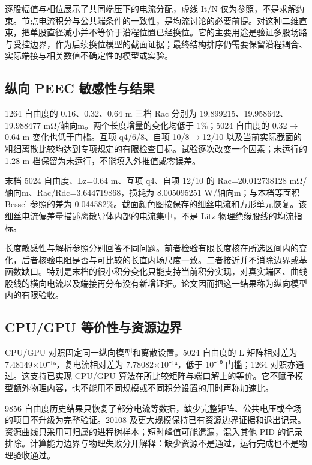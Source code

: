 \documentclass[11pt]{article}
\begin{document}
逐股幅值与相位展示了共同端压下的电流分配，虚线 It/N 仅为参照，不是求解约束。节点电流积分与公共端条件的一致性，是均流讨论的必要前提。对这种二维直束，把单股直径减小并不等价于沿程位置已经换位。它的主要用途是验证多股场路与受控边界，作为后续换位模型的截面证据；最终结构排序仍需要保留沿程耦合、实际端接与相关数值不确定性的模型或实验。


\subsection*{纵向 PEEC 敏感性与结果}
\hypertarget{03.peec_results.heading}{}
1264 自由度的 0.16、0.32、0.64 m 三档 Rac 分别为 19.899215、19.958642、19.988477 mΩ/轴向m。两个长度增量的变化均低于 1\%；5024 自由度的 0.32\(\to\)0.64 m 变化也低于门槛。互项 q4/6/8、自项 10/8\(\to\)12/10 以及当前实际截面的粗细离散比较均达到专项规定的有限检查目标。试验逐次改变一个因素；未运行的 1.28 m 档保留为未运行，不能填入外推值或零误差。


末档 5024 自由度、Lz=0.64 m、互项 q4、自项 12/10 的 Rac=20.012738128 mΩ/轴向m、Rac/Rdc=3.644719868，损耗为 8.005095251 W/轴向m；与本档等面积 Bessel 参照的差为 0.044582\%。截面颜色图按保存的细丝电流和方形单元恢复。该细丝电流偏差量描述离散导体内部的电流集中，不是 Litz 物理绝缘股线的均流指标。


长度敏感性与解析参照分别回答不同问题。前者检验有限长度核在所选区间内的变化，后者核验电阻是否与可比较的长直内场尺度一致。二者接近并不消除边界或基函数缺口。特别是末档的很小积分变化只能支持当前积分实现，对真实端区、曲线股线的横向电流以及端接再分布没有新增证据。论文因而把这一结果称为纵向模型内的有限验收。


\subsection*{CPU/GPU 等价性与资源边界}
\hypertarget{03.compute.heading}{}
CPU/GPU 对照固定同一纵向模型和离散设置。5024 自由度的 L 矩阵相对差为 7.48149×10⁻¹⁶，复电流相对差为 7.78082×10⁻¹⁴，低于 10⁻¹⁰ 门槛；1264 对照亦通过。这支持已实现 CPU/GPU 算法在所比较矩阵与端口解上的等价。它不赋予模型额外物理内容，也不能用不同规模或不同积分设置的用时声称加速比。


9856 自由度历史结果只恢复了部分电流等数据，缺少完整矩阵、公共电压或全场的项目不升级为完整验证。20108 及更大规模保持已有资源边界证据和退出记录。资源曲线只采用可归属的进程树样本；短时峰值可能遗漏，混入其他 PID 的记录排除。计算能力边界与物理失败分开解释：缺少资源不是通过，运行完成也不是物理验收通过。
\end{document}
